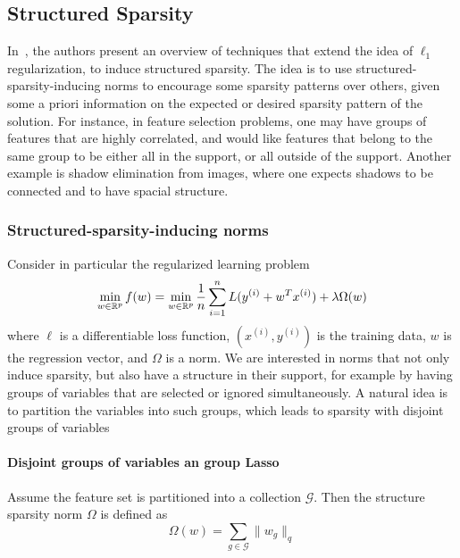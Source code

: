 \subsection{Structured Sparsity}
In~\cite{Bach:2011kx}, the authors present an overview of techniques that extend the idea of $\ell_1$ regularization, to induce structured sparsity. The idea is to use structured-sparsity-inducing norms to encourage some sparsity patterns over others, given some a priori information on the expected or desired sparsity pattern of the solution. For instance, in feature selection problems, one may have groups of features that are highly correlated, and would like features that belong to the same group to be either all in the support, or all outside of the support. Another example is shadow elimination from images, where one expects shadows to be connected and to have spacial structure.


\subsubsection{Structured-sparsity-inducing norms}
Consider in particular the regularized learning problem
\begin{equation}
\label{eq:struct_spars}
\min_{w \in {\mathbb R}^p} f(w) = \min_{w \in {\mathbb R}^p} \frac{1}{n} \sum_{i = 1}^n L(y^{(i)} + w^Tx^{(i)}) + \lambda \Omega(w)
\end{equation}
where $\ell$ is a differentiable loss function, $(x^{(i)}, y^{(i)})$ is the training data, $w$ is the regression vector, and $\Omega$ is a norm. We are interested in norms that not only induce sparsity, but also have a structure in their support, for example by having groups of variables that are selected or ignored simultaneously. A natural idea is to partition the variables into such groups, which leads to sparsity with disjoint groups of variables

\paragraph{Disjoint groups of variables an group Lasso}
Assume the feature set is partitioned into a collection $\mathcal{G}$. Then the structure sparsity norm $\Omega$ is defined as
\[
\Omega(w)  = \sum_{g \in \mathcal{G}} \|w_g\|_q
\]

